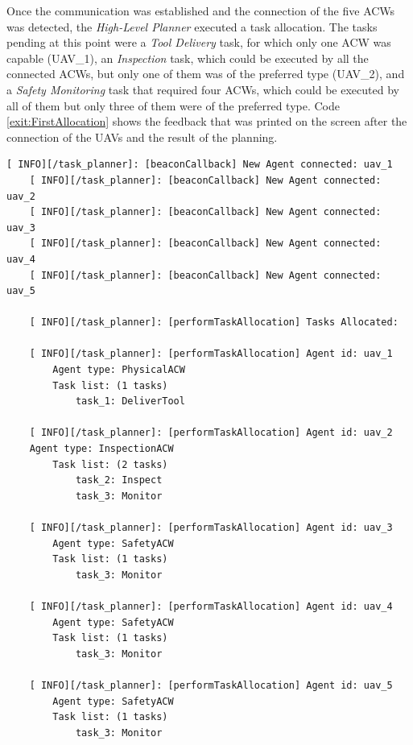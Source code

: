 Once the communication was established and the connection of the five \glspl{ACW} was detected, the \emph{High-Level Planner} executed a task allocation. The tasks pending at this point were a \emph{Tool Delivery} task, for which only one \gls{ACW} was capable (UAV\_1), an \emph{Inspection} task, which could be executed by all the connected \glspl{ACW}, but only one of them was of the preferred type (UAV\_2), and a \emph{Safety Monitoring} task that required four \glspl{ACW}, which could be executed by all of them but only three of them were of the preferred type. Code \ref{exit:FirstAllocation} shows the feedback that was printed on the screen after the connection of the \glspl{UAV} and the result of the planning.

\begin{lstlisting}[caption={Feedback messages printed after the connection of the \glspl{UAV} and the planning}, breaklines=true, label=exit:FirstAllocation]
    [ INFO][/task_planner]: [beaconCallback] New Agent connected: uav_1
    [ INFO][/task_planner]: [beaconCallback] New Agent connected: uav_2
    [ INFO][/task_planner]: [beaconCallback] New Agent connected: uav_3
    [ INFO][/task_planner]: [beaconCallback] New Agent connected: uav_4
    [ INFO][/task_planner]: [beaconCallback] New Agent connected: uav_5
    
    [ INFO][/task_planner]: [performTaskAllocation] Tasks Allocated:
    
    [ INFO][/task_planner]: [performTaskAllocation] Agent id: uav_1
        Agent type: PhysicalACW
        Task list: (1 tasks)
            task_1: DeliverTool
    
    [ INFO][/task_planner]: [performTaskAllocation] Agent id: uav_2
    Agent type: InspectionACW
        Task list: (2 tasks)
            task_2: Inspect
            task_3: Monitor
    
    [ INFO][/task_planner]: [performTaskAllocation] Agent id: uav_3
        Agent type: SafetyACW
        Task list: (1 tasks)
            task_3: Monitor
    
    [ INFO][/task_planner]: [performTaskAllocation] Agent id: uav_4
        Agent type: SafetyACW
        Task list: (1 tasks)
            task_3: Monitor
    
    [ INFO][/task_planner]: [performTaskAllocation] Agent id: uav_5
        Agent type: SafetyACW
        Task list: (1 tasks)
            task_3: Monitor
\end{lstlisting}


